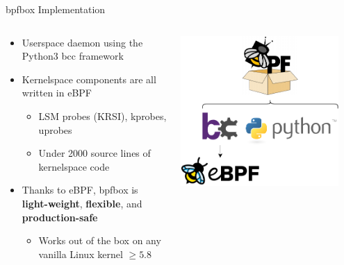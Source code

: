 \documentclass[12pt, dvipsnames, aspectratio=169]{beamer}
\begin{document}
\begin{frame}[c]{bpfbox Implementation}
\begin{columns}
    \begin{column}{0.66\textwidth}
        \begin{itemize}
            \item Userspace daemon using the Python3 bcc framework
            \vspace{2em}
            \item Kernelspace components are all written in eBPF
            \begin{itemize}
                \item LSM probes (KRSI), kprobes, uprobes
                \item Under 2000 source lines of kernelspace code
            \end{itemize}
            \vspace{2em}
            \item Thanks to eBPF, bpfbox is \textbf{light-weight}, \textbf{flexible}, and \textbf{production-safe}
            \begin{itemize}
                \item Works out of the box on any vanilla Linux kernel $\ge 5.8$
            \end{itemize}
        \end{itemize}
    \end{column}
    \begin{column}{0.33\textwidth}
        \begin{center}
            \color{black}
            \includegraphics[width=0.9\textwidth]{figs/at-a-glance.pdf}
        \end{center}
        \vspace{2em}
    \end{column}
\end{columns}
\end{frame}
\end{document}
